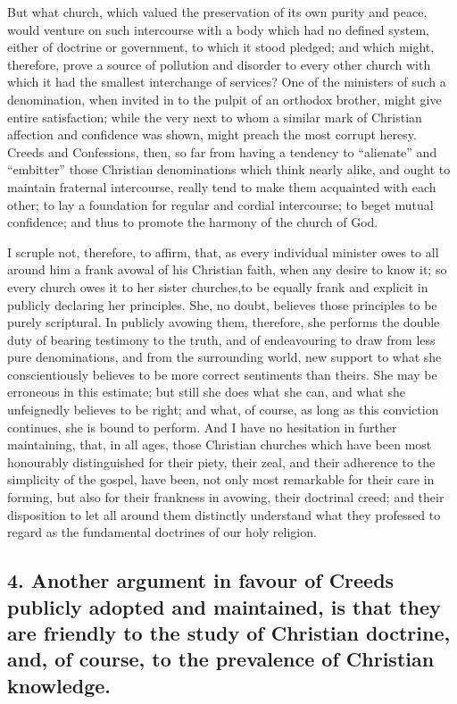 \documentclass[
]{book}
\begin{document}
But what church, which valued the preservation of its own purity and peace, would venture on such intercourse with a body which had no defined system, either of doctrine or government, to which it stood pledged; and which might, therefore, prove a source of pollution and disorder to every other church with which it had the smallest interchange of services? One of the ministers of such a denomination, when invited in to the pulpit of an orthodox brother, might give entire satisfaction; while the very next to whom a similar mark of Christian affection and confidence was shown, might preach the most corrupt heresy. Creeds and Confessions, then, so far from having a tendency to ``alienate'' and ``embitter'' those Christian denominations which think nearly alike, and ought to maintain fraternal intercourse, really tend to make them acquainted with each other; to lay a foundation for regular and cordial intercourse; to beget mutual confidence; and thus to promote the harmony of the church of God.

I scruple not, therefore, to affirm, that, as every individual minister owes to all around him a frank avowal of his Christian faith, when any desire to know it; so every church owes it to her sister churches,to be equally frank and explicit in publicly declaring her principles. She, no doubt, believes those principles to be purely scriptural. In publicly avowing them, therefore, she performs the double duty of bearing testimony to the truth, and of endeavouring to draw from less pure denominations, and from the surrounding world, new support to what she conscientiously believes to be more correct sentiments than theirs. She may be erroneous in this estimate; but still she does what she can, and what she unfeignedly believes to be right; and what, of course, as long as this conviction continues, she is bound to perform. And I have no hesitation in further maintaining, that, in all ages, those Christian churches which have been most honourably distinguished for their piety, their zeal, and their adherence to the simplicity of the gospel, have been, not only most remarkable for their care in forming, but also for their frankness in avowing, their doctrinal creed; and their disposition to let all around them distinctly understand what they professed to regard as the fundamental doctrines of our holy religion.

\hypertarget{another-argument-in-favour-of-creeds-publicly-adopted-and-maintained-is-that-they-are-friendly-to-the-study-of-christian-doctrine-and-of-course-to-the-prevalence-of-christian-knowledge.}{%
\subsection{4. Another argument in favour of Creeds publicly adopted and maintained, is that they are friendly to the study of Christian doctrine, and, of course, to the prevalence of Christian knowledge.}\label{another-argument-in-favour-of-creeds-publicly-adopted-and-maintained-is-that-they-are-friendly-to-the-study-of-christian-doctrine-and-of-course-to-the-prevalence-of-christian-knowledge.}}
\end{document}
